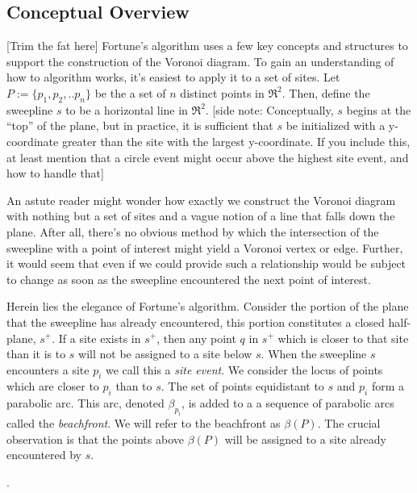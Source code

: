 \documentclass[12pt,twoside]{reedthesis}
\begin{document}
  \subsection{Conceptual Overview} %
  \label{sub:conceptual_overview}
  [Trim the fat here]
  Fortune's algorithm uses a few key concepts and structures to support the construction of the Voronoi diagram. To gain an understanding of how to algorithm works, it's easiest to apply it to a set of sites. Let $P:=\{p_{1}, p_{2}, .. p_{n}\}$ be the a set of $n$ distinct points in $\Re^{2}$. Then, define the sweepline $s$ to be a horizontal line in $\Re^{2}$. [side note: Conceptually, $s$ begins at the ``top'' of the plane, but in practice, it is sufficient that $s$ be initialized with a y-coordinate greater than the site with the largest y-coordinate. If you include this, at least mention that a circle event might occur above the highest site event, and how to handle that]\par
  An astute reader might wonder how exactly we construct the Voronoi diagram with nothing but a set of sites and a vague notion of a line that falls down the plane. After all, there's no obvious method by which the intersection of the sweepline with a point of interest might yield a Voronoi vertex or edge. Further, it would seem that even if we could provide such a relationship would be subject to change as soon as the sweepline encountered the next point of interest. \par
  Herein lies the elegance of Fortune's algorithm. Consider the portion of the plane that the sweepline has already encountered, this portion constitutes a closed half-plane, $s^+$. If a site exists in $s^+$, then any point $q$ in $s^+$ which is closer to that site than it is to $s$ will not be assigned to a site below $s$. When the sweepline $s$ encounters a site $p_{i}$ we call this a \emph{site event}. We consider the locus of points which are closer to $p_{i}$ than to $s$. The set of points equidistant to $s$ and $p_{i}$ form a parabolic arc. This arc, denoted $\beta_{p_{i}}$, is added to a a sequence of parabolic arcs called the \emph{beachfront}. We will refer to the beachfront as $\beta(P)$. The crucial observation is that the points above $\beta(P)$ will be assigned to a site already encountered by $s$. \par
  [Make sure there's a clear difference between the notation used for the parabola and the notation used for an arc].
\end{document}
